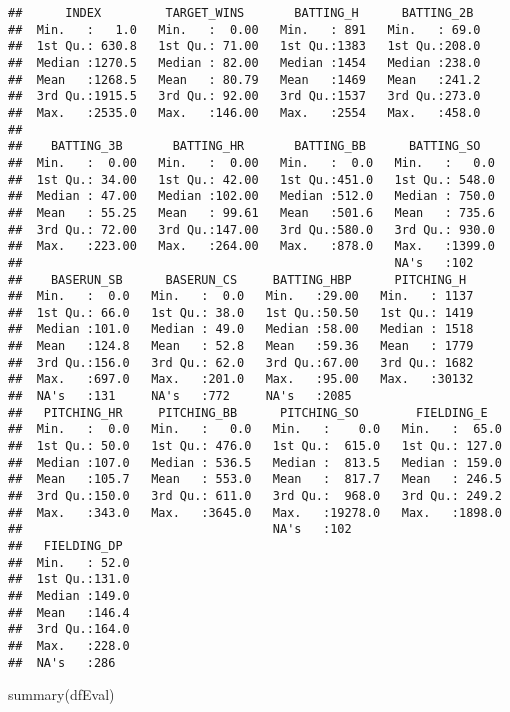 \documentclass[
]{article}
\newenvironment{Shaded}{\begin{snugshade}}{\end{snugshade}}
\newcommand{\FunctionTok}[1]{\textcolor[rgb]{0.00,0.00,0.00}{#1}}
\newcommand{\NormalTok}[1]{#1}
\begin{document}
\begin{verbatim}
##      INDEX         TARGET_WINS       BATTING_H      BATTING_2B   
##  Min.   :   1.0   Min.   :  0.00   Min.   : 891   Min.   : 69.0  
##  1st Qu.: 630.8   1st Qu.: 71.00   1st Qu.:1383   1st Qu.:208.0  
##  Median :1270.5   Median : 82.00   Median :1454   Median :238.0  
##  Mean   :1268.5   Mean   : 80.79   Mean   :1469   Mean   :241.2  
##  3rd Qu.:1915.5   3rd Qu.: 92.00   3rd Qu.:1537   3rd Qu.:273.0  
##  Max.   :2535.0   Max.   :146.00   Max.   :2554   Max.   :458.0  
##                                                                  
##    BATTING_3B       BATTING_HR       BATTING_BB      BATTING_SO    
##  Min.   :  0.00   Min.   :  0.00   Min.   :  0.0   Min.   :   0.0  
##  1st Qu.: 34.00   1st Qu.: 42.00   1st Qu.:451.0   1st Qu.: 548.0  
##  Median : 47.00   Median :102.00   Median :512.0   Median : 750.0  
##  Mean   : 55.25   Mean   : 99.61   Mean   :501.6   Mean   : 735.6  
##  3rd Qu.: 72.00   3rd Qu.:147.00   3rd Qu.:580.0   3rd Qu.: 930.0  
##  Max.   :223.00   Max.   :264.00   Max.   :878.0   Max.   :1399.0  
##                                                    NA's   :102     
##    BASERUN_SB      BASERUN_CS     BATTING_HBP      PITCHING_H   
##  Min.   :  0.0   Min.   :  0.0   Min.   :29.00   Min.   : 1137  
##  1st Qu.: 66.0   1st Qu.: 38.0   1st Qu.:50.50   1st Qu.: 1419  
##  Median :101.0   Median : 49.0   Median :58.00   Median : 1518  
##  Mean   :124.8   Mean   : 52.8   Mean   :59.36   Mean   : 1779  
##  3rd Qu.:156.0   3rd Qu.: 62.0   3rd Qu.:67.00   3rd Qu.: 1682  
##  Max.   :697.0   Max.   :201.0   Max.   :95.00   Max.   :30132  
##  NA's   :131     NA's   :772     NA's   :2085                   
##   PITCHING_HR     PITCHING_BB      PITCHING_SO        FIELDING_E    
##  Min.   :  0.0   Min.   :   0.0   Min.   :    0.0   Min.   :  65.0  
##  1st Qu.: 50.0   1st Qu.: 476.0   1st Qu.:  615.0   1st Qu.: 127.0  
##  Median :107.0   Median : 536.5   Median :  813.5   Median : 159.0  
##  Mean   :105.7   Mean   : 553.0   Mean   :  817.7   Mean   : 246.5  
##  3rd Qu.:150.0   3rd Qu.: 611.0   3rd Qu.:  968.0   3rd Qu.: 249.2  
##  Max.   :343.0   Max.   :3645.0   Max.   :19278.0   Max.   :1898.0  
##                                   NA's   :102                       
##   FIELDING_DP   
##  Min.   : 52.0  
##  1st Qu.:131.0  
##  Median :149.0  
##  Mean   :146.4  
##  3rd Qu.:164.0  
##  Max.   :228.0  
##  NA's   :286
\end{verbatim}

\begin{Shaded}
\begin{Highlighting}[]
\FunctionTok{summary}\NormalTok{(dfEval)}
\end{Highlighting}
\end{Shaded}
\end{document}
